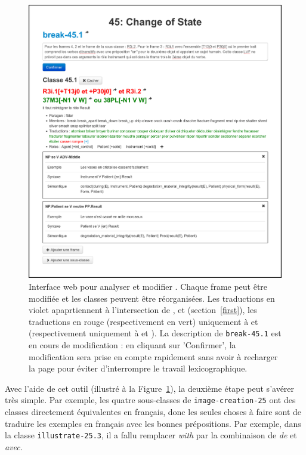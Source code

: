 \begin{figure}

    \includegraphics[width=\textwidth]{fig/tool_screenshot_2014-09-12.png}

    \caption{\label{tool}Interface web pour analyser et modifier \verbenet{}.
        Chaque frame peut être modifiée et les classes peuvent être
        réorganisées. Les traductions en violet apaprtiennent à l'intersection
        de \Clvf{}, \Clg{} et \Ltrad{} (section~\ref{first}), les traductions
        en rouge (respectivement en vert) uniquement à \Clvf{} et \Ltrad
        (respectivement uniquement à \Clg{} et \Ltrad{}). La description de
        {\color{blue}\texttt{break-45.1}} est en cours de modification : en cliquant sur
        'Confirmer', la modification sera prise en compte rapidement sans avoir
    à recharger la page pour éviter d'interrompre le travail lexicographique.}

\end{figure}

Avec l'aide de cet outil (illustré à la Figure~\ref{tool}), la deuxième étape
peut s'avérer très simple. Par exemple, les quatre sous-classes de
{\color{blue}\texttt{image-creation-25}} ont des classes directement équivalentes en
français, donc les seules choses à faire sont de traduire les exemples en
français avec les bonnes prépositions. Par exemple, dans la classe
{\color{blue}\texttt{illustrate-25.3}}, il a fallu remplacer \emph{with} par la
combinaison de \emph{de} et \emph{avec}.


